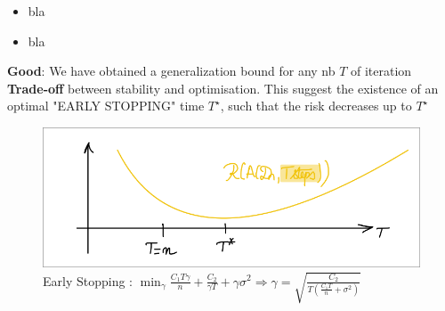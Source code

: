 \begin{itemize}
    \item [\textcolor{green}{\checkmark}] bla
    \item [\textcolor{red}{\texttimes}] bla
\end{itemize}
\textbf{Good}: We have obtained a generalization bound for any nb $ T $ of iteration \\
\textbf{Trade-off} between stability and optimisation. This suggest the existence of an optimal "EARLY STOPPING" time $ T^\star  $, such that the risk decreases up to $ T^\star  $     
\begin{figure}[!h]
    \centering
    \includegraphics[width=.75\textwidth]{figs/early_stoping.png}
    \caption{Early Stopping : $ \min _\gamma \frac{C_1 T \gamma }{n } + \frac{C_2}{\gamma T} + \gamma \sigma ^2 \Rightarrow \gamma = \sqrt{\frac{C_2}{T(\frac{C_1 T}{n} + \sigma ^2)}} $ }
\end{figure}